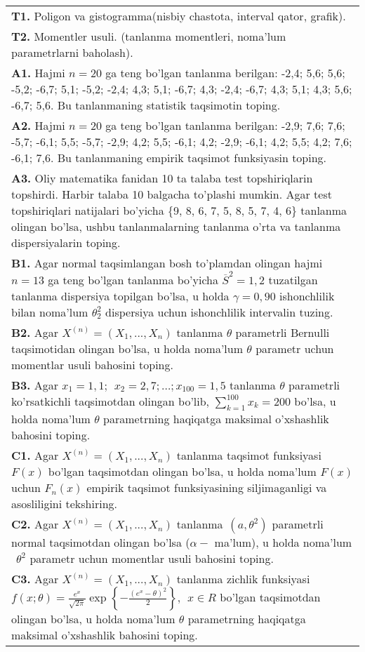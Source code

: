 \documentclass{article}
\begin{document}
\begin{tabular}{m{17cm}}
\textbf{T1.} 
Poligon va gistogramma(nisbiy chastota, interval qator, grafik).
\\
\textbf{T2.} 
Momentler usuli. (tanlanma momentleri, noma'lum parametrlarni baholash).
\\
\textbf{A1.} 
Hajmi \(n = 20\) ga teng bo'lgan tanlanma berilgan: -2,4; 5,6; 5,6; -5,2; -6,7; 5,1; -5,2; -2,4; 4,3; 5,1; -6,7; 4,3; -2,4; -6,7; 4,3; 5,1; 4,3; 5,6; -6,7; 5,6. Bu tanlanmaning statistik taqsimotin toping.
\\
\textbf{A2.} 
Hajmi \(n = 20\) ga teng bo'lgan tanlanma berilgan: -2,9; 7,6; 7,6; -5,7; -6,1; 5,5; -5,7; -2,9; 4,2; 5,5; -6,1; 4,2; -2,9; -6,1; 4,2; 5,5; 4,2; 7,6; -6,1; 7,6. Bu tanlanmaning empirik taqsimot funksiyasin toping.
\\
\textbf{A3.} 
Oliy matematika fanidan 10 ta talaba test topshiriqlarin topshirdi. Harbir talaba 10 balgacha to'plashi mumkin. Agar test topshiriqlari natijalari bo'yicha \{9, 8, 6, 7, 5, 8, 5, 7, 4, 6\} tanlanma olingan bo'lsa, ushbu tanlanmalarning tanlanma o'rta va tanlanma dispersiyalarin toping.
\\
\textbf{B1.} 
Agar normal taqsimlangan bosh to'plamdan olingan hajmi \(n = 13\) ga teng bo'lgan tanlanma bo'yicha \({\overline{S}}^{2} = 1,2\) tuzatilgan tanlanma dispersiya topilgan bo'lsa, u holda \(\gamma = 0,90\) ishonchlilik bilan noma'lum \(\theta_{2}^{2}\) dispersiya uchun ishonchlilik intervalin tuzing.
\\
\textbf{B2.} 
Agar \(X^{(n)} = \left( X_{1},...,X_{n} \right)\) tanlanma \(\theta\) parametrli Bernulli taqsimotidan olingan bo'lsa, u holda noma'lum \(\theta\) parametr uchun momentlar usuli bahosini toping.
\\
\textbf{B3.} 
Agar \(x_{1} = 1,1;\ \ x_{2} = 2,7;\ldots;x_{100} = 1,5\) tanlanma \(\theta\) parametrli ko'rsatkichli taqsimotdan olingan bo'lib, \(\sum_{k = 1}^{100}x_{k} = 200\) bo'lsa, u holda noma'lum \(\theta\) parametrning haqiqatga maksimal o'xshashlik bahosini toping.
\\
\textbf{C1.} 
Agar \(X^{(n)} = \left( X_{1},...,X_{n} \right)\) tanlanma taqsimot funksiyasi \(F(x)\) bo'lgan taqsimotdan olingan bo'lsa, u holda noma'lum \(F(x)\) uchun \(F_{n}(x)\) empirik taqsimot funksiyasining siljimaganligi va asosliligini tekshiring.
\\
\textbf{C2.} 
Agar \(X^{(n)} = \left( X_{1},...,X_{n} \right)\) tanlanma\(\ \ (a,\theta^{2})\) parametrli normal taqsimotdan olingan bo'lsa (\(\alpha -\) ma'lum), u holda noma'lum\(\ \ \theta^{2}\) parametr uchun momentlar usuli bahosini toping.
\\
\textbf{C3.} 
Agar \(X^{(n)} = \left( X_{1},...,X_{n} \right)\) tanlanma zichlik funksiyasi \(f(x;\theta) = \frac{e^{x}}{\sqrt{2\pi}}\exp\left\{ - \frac{\left( e^{x} - \theta \right)^{2}}{2} \right\},\ \ x \in R\) bo'lgan taqsimotdan olingan bo'lsa, u holda noma'lum \(\theta\) parametrning haqiqatga maksimal o'xshashlik bahosini toping.
\\

\end{tabular}
\vspace{1cm}
\end{document}
